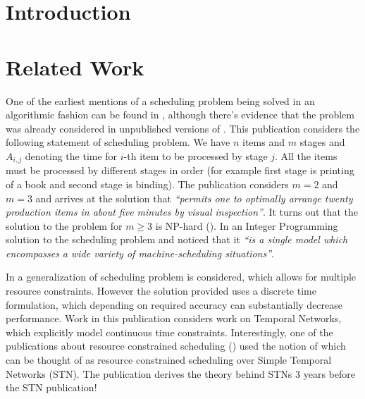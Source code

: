\documentclass{article}
\begin{document}
\begin{multicols}{2}
\begin{abstract}
\noindent %
\end{abstract}
\section{Introduction}

\section{Related Work}

One of the earliest mentions of a scheduling problem being solved in an algorithmic fashion can be found in \cite{johnson1954optimal}, although there's evidence that the problem was already considered in unpublished versions of \cite{bellman1956mathematical}. This publication considers the following statement of scheduling problem. We have $n$ items and $m$ stages and $A_{i,j}$ denoting the time for $i$-th item to be processed by stage $j$. All the items must be processed by different stages in order (for example first stage is printing of a book and second stage is binding). The publication considers $m=2$ and $m=3$ and arrives at the solution that \textit{``permits one to optimally arrange twenty production items in about five minutes by visual inspection''}. It turns out that the solution to the problem for $m \geq 3$ is NP-hard (\cite{garey1976complexity}). In \cite{wagner1959integer} an Integer Programming solution to the scheduling problem and noticed that it \textit{``is a single model which encompasses a wide variety of machine-scheduling situations''}.

In \cite{pritsker1969multiproject} a generalization of scheduling problem is considered, which allows for multiple resource constraints. However the solution provided uses a discrete time formulation, which depending on required accuracy can substantially decrease performance. Work in this publication considers work on Temporal Networks, which explicitly model continuous time constraints. Interestingly, one of the publications about resource constrained scheduling (\cite{bartusch1988scheduling}) used the notion of which can be thought of as resource constrained scheduling over Simple Temporal Networks (STN). The publication derives the theory behind STNs 3 years before the STN publication!


\end{multicols}
\end{document}
